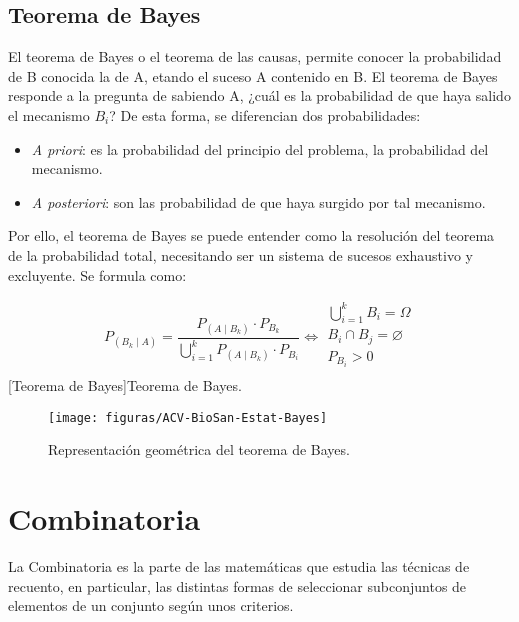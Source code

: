 \subsection{Teorema de Bayes}
El teorema de Bayes o el teorema de las causas, permite conocer la probabilidad de B conocida la de A, etando el suceso A contenido en B. El teorema de Bayes responde a la pregunta de sabiendo A, ¿cuál es la probabilidad de que haya salido el mecanismo $B_i$? De esta forma, se diferencian dos probabilidades:
\begin{itemize}[itemsep=0pt,parsep=0pt,topsep=0pt,partopsep=0pt]
    \item \textit{A priori}: es la probabilidad del principio del problema, la probabilidad del mecanismo.
    \item \textit{A posteriori}: son las probabilidad de que haya surgido por tal mecanismo.
\end{itemize}
Por ello, el teorema de Bayes se puede entender como la resolución del teorema de la probabilidad total, necesitando ser un sistema de sucesos exhaustivo y excluyente. Se formula como:
\begin{multicols}{2}
    \begin{center}
        \begin{equation}
            P_{\left( B_k\mid A\right) } = \dfrac{P_{\left( A\mid B_k \right) }\cdot P_{B_k}}{\bigcup_{i=1}^k P_{\left( A\mid B_k\right)} \cdot P_{B_i}} \iff
                \begin{array}{c}
                    \bigcup_{i=1}^k B_i = \Omega\\
                    B_i \cap B_j = \varnothing \\
                    P_{B_i} > 0 \\
                \end{array}
        \end{equation}
        [Teorema de Bayes]{Teorema de Bayes.}
    \end{center}
    \columnbreak
    \begin{figure}[H]
        \texttt{[image: figuras/ACV-BioSan-Estat-Bayes]}
        \caption[Representación geométrica del teorema de Bayes]{Representación geométrica del teorema de Bayes.}
    \end{figure}
\end{multicols}
\section{Combinatoria}
La Combinatoria es la parte de las matemáticas que estudia las técnicas de recuento, en particular, las distintas formas de seleccionar subconjuntos de elementos de un conjunto según unos criterios.
